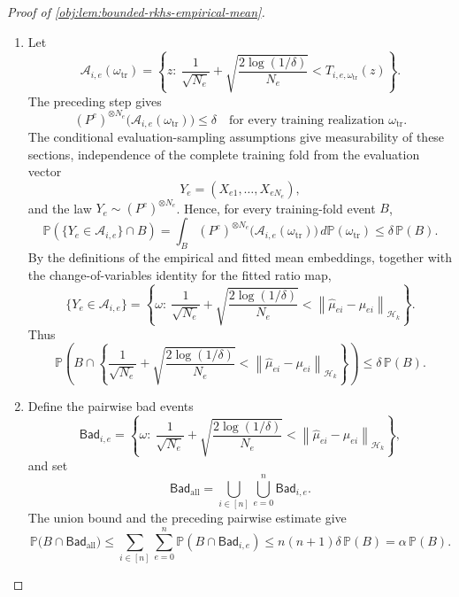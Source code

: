 \begin{proof}[Proof of \cref{obj:lem:bounded-rkhs-empirical-mean}]
\begin{enumerate}
\item Let
\[
\mathcal A_{i,e}(\omega_{\mathrm{tr}})
=
\left\{
z:\ 
\frac1{\sqrt{N_e}}
+\sqrt{\frac{2\log(1/\delta)}{N_e}}
<
T_{i,e,\omega_{\mathrm{tr}}}(z)
\right\}.
\]
The preceding step gives
\[
(P^e)^{\otimes N_e}\bigl(\mathcal A_{i,e}(\omega_{\mathrm{tr}})\bigr)\le\delta
\quad\text{for every training realization }\omega_{\mathrm{tr}}.
\]
The conditional evaluation-sampling assumptions give measurability of these sections, independence of the complete training fold from the evaluation vector
\[
Y_e=(X_{e1},\ldots,X_{eN_e}),
\]
and the law \(Y_e\sim (P^e)^{\otimes N_e}\).  Hence, for every training-fold event \(B\),
\[
\mathbb P\!\left(\{Y_e\in \mathcal A_{i,e}\}\cap B\right)
=
\int_B
(P^e)^{\otimes N_e}\bigl(\mathcal A_{i,e}(\omega_{\mathrm{tr}})\bigr)
\,d\mathbb P(\omega_{\mathrm{tr}})
\le
\delta\,\mathbb P(B).
\]
By the definitions of the empirical and fitted mean embeddings, together with the change-of-variables identity for the fitted ratio map,
\[
\{Y_e\in \mathcal A_{i,e}\}
=
\left\{
\omega:\ 
\frac1{\sqrt{N_e}}
+\sqrt{\frac{2\log(1/\delta)}{N_e}}
<
\left\|\widehat\mu_{ei}-\mu_{ei}\right\|_{\mathcal H_k}
\right\}.
\]
Thus
\[
\mathbb P\!\left(
B\cap
\left\{
\frac1{\sqrt{N_e}}
+\sqrt{\frac{2\log(1/\delta)}{N_e}}
<
\left\|\widehat\mu_{ei}-\mu_{ei}\right\|_{\mathcal H_k}
\right\}
\right)
\le
\delta\,\mathbb P(B).
\]

\item Define the pairwise bad events
\[
\mathsf{Bad}_{i,e}
=
\left\{
\omega:\ 
\frac1{\sqrt{N_e}}
+\sqrt{\frac{2\log(1/\delta)}{N_e}}
<
\left\|\widehat\mu_{ei}-\mu_{ei}\right\|_{\mathcal H_k}
\right\},
\]
and set
\[
\mathsf{Bad}_{\mathrm{all}}
=
\bigcup_{i\in[n]}\bigcup_{e=0}^{n}\mathsf{Bad}_{i,e}.
\]
The union bound and the preceding pairwise estimate give
\[
\mathbb P\bigl(B\cap \mathsf{Bad}_{\mathrm{all}}\bigr)
\le
\sum_{i\in[n]}\sum_{e=0}^{n}
\mathbb P(B\cap \mathsf{Bad}_{i,e})
\le
n(n+1)\delta\,\mathbb P(B)
=
\alpha\,\mathbb P(B).
\]


\end{enumerate}
\end{proof}
